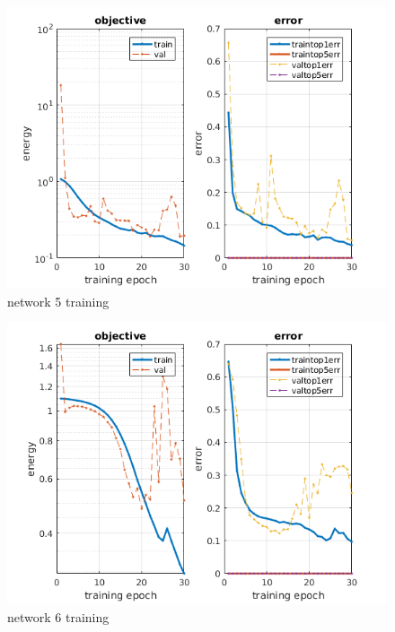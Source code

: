 \documentclass{beamer}
\begin{document}



\begin{frame}


\begin{figure}[h]
	\begin{center}
		\includegraphics[scale=0.5]{init_5.png}
		\caption{network 5 training}
		\label{fig:training5}
	\end{center}
\end{figure}

\end{frame}




\begin{frame}


\begin{figure}[h]
	\begin{center}
		\includegraphics[scale=0.5]{init_6.png}
		\caption{network 6 training}
		\label{fig:training6}
	\end{center}
\end{figure}


\end{frame}
\end{document}
